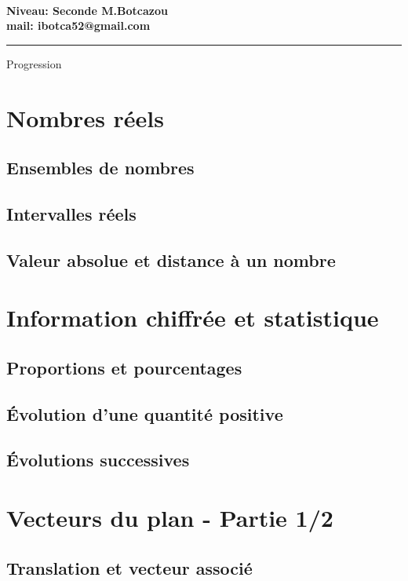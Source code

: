 \documentclass[10pt,a4paper]{article}
\theoremstyle{definition}
\theoremstyle{definition}
\begin{document}
		
\\
{\bfseries Niveau: Seconde \hfill M.Botcazou   }\\
{\bfseries mail: ibotca52@gmail.com}\\
\rule[0.5ex]{\textwidth}{0.1mm}	

\begin{center}
	\Large \sc Progression 	
\end{center}


\section{Nombres réels}
\subsection{Ensembles de nombres }
\subsection{Intervalles réels}
\subsection{Valeur absolue et distance à un nombre}

\section{Information chiffrée et statistique}
\subsection{Proportions et pourcentages}
\subsection{Évolution d'une quantité positive}
\subsection{Évolutions successives}

\section{Vecteurs du plan - Partie 1/2}
\subsection{Translation et vecteur associé}
\end{document}
